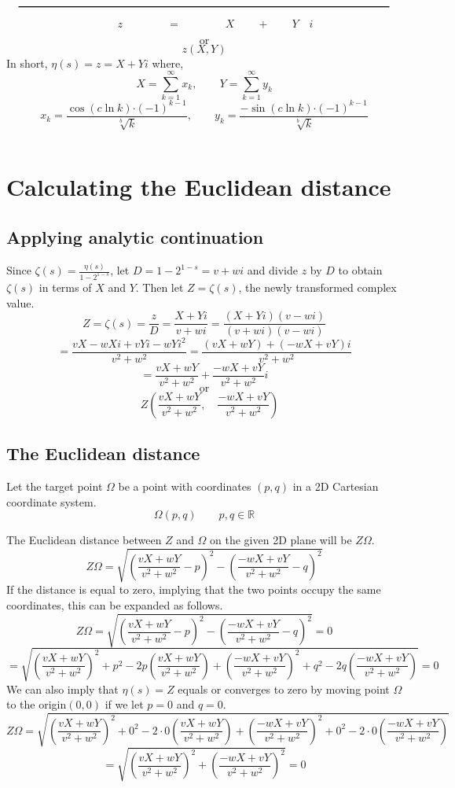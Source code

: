 \documentclass{amsart}
\begin{document}
	\[\quad \rule{12 cm}{.8pt} \quad \]
	\[ \qquad \qquad \qquad z \qquad\qquad =  \qquad\qquad X \qquad + \qquad Y \quad i \qquad\qquad \]
	
	\[ \text{or} \]
	\[ z (X, Y) \]
	\[\]
	In short, $\eta(s) = z = X + Yi$ where,
	\[ X = \sum\limits_{k=1}^{\infty}x_k, \qquad Y = \sum\limits_{k=1}^{\infty}y_k \]
	\[ x_k = \frac{\cos({c\ln k}){\cdot({-}1)^{k-1}}}{\sqrt[b]{k}}, \qquad y_k = \frac{-\sin({c\ln k}){\cdot({-}1)^{k-1}}}{\sqrt[b]{k}} \]
	
	\[\]
	
	\section{Calculating the Euclidean distance}
	\subsection{Applying analytic continuation}
	Since $\zeta(s) = \frac{\eta(s)}{1-2^{1-s}}$, let $D = 1-2^{1-s}=v+wi$ and divide $z$ by $D$ to obtain $\zeta(s)$ in terms of $X$ and $Y$. Then let $Z = \zeta(s)$, the newly transformed complex value.
	\[ Z = \zeta(s) = \frac{z}{D} = \frac{X+Yi}{v+wi} = \frac{(X+Yi)(v-wi)}{(v+wi)(v-wi)} \]
	\[ = \frac{vX-wXi+vYi-wYi^2}{v^2+w^2} = \frac{(vX+wY)+(-wX+vY)i}{v^2+w^2} \]
	\[ = \frac{vX+wY}{v^2+w^2} + \frac{-wX+vY}{v^2+w^2}i \]
	\[ \text{or} \]
	\[ \quad Z(\frac{vX+wY}{v^2+w^2}, \quad \frac{-wX+vY}{v^2+w^2}) \]
	\[\]
	
	
	\subsection{The Euclidean distance}
	Let the target point $\Omega$ be a point with coordinates $(p,q)$ in a 2D Cartesian coordinate system.
	\[ \Omega(p, q) \qquad p,q \in \mathbb{R} \]

	The Euclidean distance between $Z$ and $\Omega$ on the given 2D plane will be $Z\Omega$.
	\[ Z\Omega = \sqrt{(\frac{vX+wY}{v^2+w^2}-p)^2 - (\frac{-wX+vY}{v^2+w^2}-q)^2} \]
	If the distance is equal to zero, implying that the two points occupy the same coordinates, this can be expanded as follows.
	\[ Z\Omega = \sqrt{(\frac{vX+wY}{v^2+w^2}-p)^2 - (\frac{-wX+vY}{v^2+w^2}-q)^2} = 0 \]
	\[ = \sqrt{  (\frac{vX{+}wY}{v^2{+}w^2})^2 {+} p^2 {-} 2p(\frac{vX{+}wY}{v^2{+}w^2}) {+} (\frac{{-}wX{+}vY}{v^2{+}w^2})^2 {+} q^2 {-}2q(\frac{{-}wX{+}vY}{v^2{+}w^2}) } = 0 \]
	We can also imply that $\eta(s)=Z$ equals or converges to zero by moving point $\Omega$ to the origin$(0,0)$ if we let $p=0$ and $q=0$.
	\[ Z\Omega = \sqrt{  (\frac{vX{+}wY}{v^2{+}w^2})^2 {+} 0^2 {-} 2 {\cdot} 0 (\frac{vX{+}wY}{v^2{+}w^2}) {+} (\frac{-wX{+}vY}{v^2{+}w^2})^2 {+} 0^2 {-} 2 {\cdot} 0 (\frac{-wX{+}vY}{v^2{+}w^2}) } \]
	\[ = \sqrt{(\frac{vX{+}wY}{v^2{+}w^2})^2 + (\frac{-wX{+}vY}{v^2{+}w^2})^2} = 0 \]
	\[\]
\end{document}
